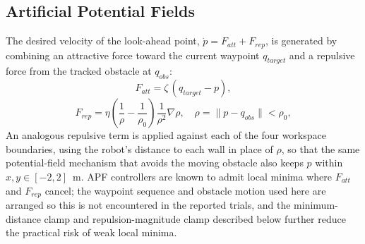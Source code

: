 \documentclass[conference]{IEEEtran}
\begin{document}
\subsection{Artificial Potential Fields}
The desired velocity of the look-ahead point, $\dot p = F_{att} + F_{rep}$, is generated by combining an attractive force toward the current waypoint $q_{target}$ and a repulsive force from the tracked obstacle at $q_{obs}$:
\begin{equation}
F_{att} = \zeta\,(q_{target} - p),
\label{eq:fatt}
\end{equation}
\begin{equation}
F_{rep} = \eta\left(\frac{1}{\rho}-\frac{1}{\rho_0}\right)\frac{1}{\rho^2}\nabla\rho, \quad \rho = \|p-q_{obs}\| < \rho_0,
\label{eq:frep}
\end{equation}
An analogous repulsive term is applied against each of the four workspace boundaries, using the robot's distance to each wall in place of $\rho$, so that the same potential-field mechanism that avoids the moving obstacle also keeps $p$ within $x,y\in[-2,2]$~m. APF controllers are known to admit local minima where $F_{att}$ and $F_{rep}$ cancel; the waypoint sequence and obstacle motion used here are arranged so this is not encountered in the reported trials, and the minimum-distance clamp and repulsion-magnitude clamp described below further reduce the practical risk of weak local minima.
\end{document}
